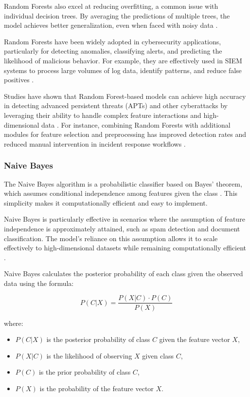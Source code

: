 Random Forests also excel at reducing overfitting, a common issue with individual decision trees. 
By averaging the predictions of multiple trees, the model achieves better generalization, even when faced with noisy data \parencite{Sopan2019}. 

Random Forests have been widely adopted in cybersecurity applications, particularly for detecting anomalies, classifying alerts, and predicting the likelihood of malicious behavior. 
For example, they are effectively used in \gls{SIEM} systems to process large volumes of log data, identify patterns, and reduce false positives \parencite{Farooq2018, Ali2024}. 

Studies have shown that Random Forest-based models can achieve high accuracy in detecting advanced persistent threats (APTs) and other cyberattacks by leveraging their ability to handle complex feature interactions and high-dimensional data \parencite{Ali2024}. 
For instance, combining Random Forests with additional modules for feature selection and preprocessing has improved detection rates and reduced manual intervention in incident response workflows \parencite{Nila2020}.

\subsubsection{Naive Bayes}

The Naive Bayes algorithm is a probabilistic classifier based on Bayes' theorem, which assumes conditional independence among features given the class \parencite{Chandra2016}.
This simplicity makes it computationally efficient and easy to implement. 

Naive Bayes is particularly effective in scenarios where the assumption of feature independence is approximately attained, such as spam detection and document classification. 
The model's reliance on this assumption allows it to scale effectively to high-dimensional datasets while remaining computationally efficient \parencite{Chandra2016}.

Naive Bayes calculates the posterior probability of each class given the observed data using the formula:

\begin{equation}
P(C|X) = \frac{P(X|C) \cdot P(C)}{P(X)}
\end{equation}

where:
\begin{itemize}
    \item \( P(C|X) \) is the posterior probability of class \( C \) given the feature vector \( X \),
    \item \( P(X|C) \) is the likelihood of observing \( X \) given class \( C \),
    \item \( P(C) \) is the prior probability of class \( C \),
    \item \( P(X) \) is the probability of the feature vector \( X \).
\end{itemize}

